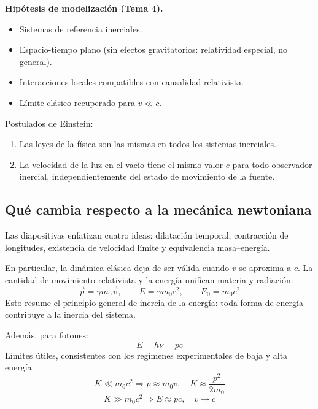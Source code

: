 \documentclass[12pt, a4paper]{article}
\theoremstyle{plain}
\theoremstyle{definition}
\theoremstyle{remark}
\newcommand{\ve}[1]{\vec{#1}}
\begin{document}
\begin{mdframed}[style=resultado]
\textbf{Hipótesis de modelización (Tema 4).}
\begin{itemize}
  \item Sistemas de referencia inerciales.
  \item Espacio-tiempo plano (sin efectos gravitatorios: relatividad especial, no general).
  \item Interacciones locales compatibles con causalidad relativista.
  \item Límite clásico recuperado para $v\ll c$.
\end{itemize}
\end{mdframed}

Postulados de Einstein:
\begin{enumerate}
  \item Las leyes de la física son las mismas en todos los sistemas inerciales.
  \item La velocidad de la luz en el vacío tiene el mismo valor $c$ para todo observador
        inercial, independientemente del estado de movimiento de la fuente.
\end{enumerate}

\subsection{Qué cambia respecto a la mecánica newtoniana}

Las diapositivas enfatizan cuatro ideas: dilatación temporal, contracción de longitudes,
existencia de velocidad límite y equivalencia masa--energía.

En particular, la dinámica clásica deja de ser válida cuando $v$ se aproxima a $c$. La cantidad
de movimiento relativista y la energía unifican materia y radiación:
\begin{equation}
  \ve{p}=\gamma m_0\ve{v},\qquad
  E=\gamma m_0c^2,\qquad
  E_0=m_0c^2
\end{equation}
Esto resume el principio general de inercia de la energía: toda forma de energía contribuye
a la inercia del sistema.

Además, para fotones:
\begin{equation}
  E=h\nu=pc
\end{equation}
Límites útiles, consistentes con los regímenes experimentales de baja y alta energía:
\begin{equation}
  K\ll m_0c^2 \Rightarrow
  p\approx m_0v,\quad
  K\approx \frac{p^2}{2m_0}
\end{equation}
\begin{equation}
  K\gg m_0c^2 \Rightarrow
  E\approx pc,\quad v\to c
\end{equation}
\end{document}
